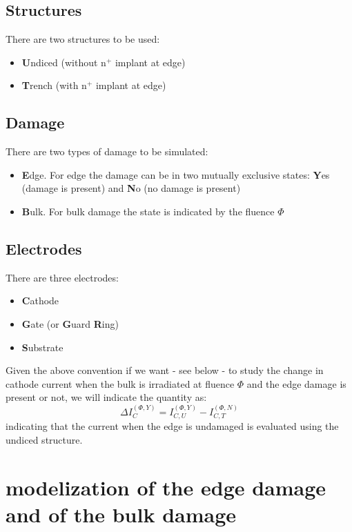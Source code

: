 \documentclass[preprint,12pt]{elsarticle}
\begin{document}
\subsection{Structures}
There are two structures to be used:
\begin{itemize}
\item {\bf U}ndiced (without n$^+$ implant at edge)
\item{\bf T}rench (with n$^+$ implant at edge)
\end{itemize}

\subsection{Damage}
There are two types of damage to be simulated:
\begin{itemize}
    \item {\bf E}dge. For edge the damage can be in two mutually exclusive states: {\bf Y}es (damage is present) and {\bf N}o (no damage is present)
    \item{\bf B}ulk. For bulk damage the state is indicated by the fluence $\Phi$
\end{itemize}

\subsection{Electrodes}
There are three electrodes:
\begin{itemize}
    \item {\bf C}athode
    \item {\bf G}ate (or {\bf G}uard {\bf R}ing)
    \item {\bf S}ubstrate
\end{itemize}

Given the above convention if we want - see below - to study the change in cathode 
current when the bulk is irradiated at fluence $\Phi$ and the edge damage is present 
or not, we will indicate the quantity as:
\begin{equation}
\Delta I_{C}^{(\Phi,Y)} = I_{C,U}^{(\Phi,Y)}-I_{C,T}^{(\Phi,N)}
\end{equation}
indicating that the current when the edge is undamaged is evaluated using the undiced 
structure.


\section{modelization of the edge damage and of the bulk damage}
\end{document}

